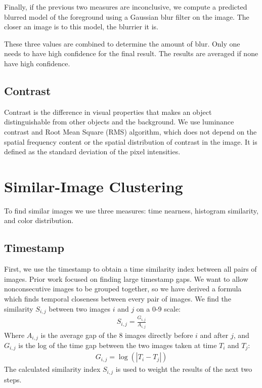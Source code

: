 \documentclass{sig-alternate}
\begin{document}
Finally, if the previous two measures are inconclusive, we compute a predicted blurred model of the foreground using a Gaussian blur filter on the image. The closer an image is to this model, the blurrier it is.

These three values are combined to determine the amount of blur. Only one needs to have high confidence for the final result. The results are averaged if none have high confidence.%


\subsection{Contrast}

Contrast is the difference in visual properties that makes an object distinguishable from other objects and the background.
We use luminance contrast and
Root Mean Square (RMS) algorithm, which does not depend on the spatial frequency content or the spatial distribution of contrast in the image. It is defined as the standard deviation of the pixel intensities\cite{ppr:1982}.

\section{Similar-Image Clustering}
To find similar images we use three measures: time nearness, histogram similarity, and color distribution.

\subsection{Timestamp}
First, we use the timestamp to obtain a time similarity index between all pairs of images. Prior work focused on finding large timestamp gaps\cite{1292402}. We want to allow nonconsecutive images to be grouped together, so we have derived a formula which finds temporal closeness between every pair of images. We find the similarity \(S_{i,j}\) between two images \(i\) and \(j\) on a 0-9 scale:
\begin{eqnarray}
S_{i,j}=\frac{G_{i,j}}{A_{i,j}}
\end{eqnarray}
Where \(A_{i,j}\) is the average gap of the 8 images directly before \(i\) and after \(j\), and  \(G_{i,j}\) is the log of the time gap between the two images taken at time \(T_i\) and \(T_j\):
\begin{eqnarray}
G_{i,j}=\log(|T_i-T_j|)
\end{eqnarray}
The calculated similarity index \(S_{i,j}\) is used to weight the results of the next two steps.
\end{document}
